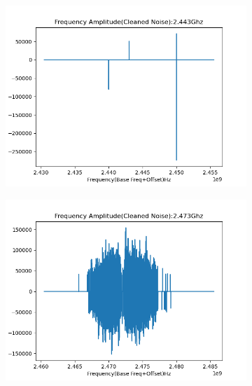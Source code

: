 \begin{itemize}
    \begin{figure}[H]
      \label{drone}
      \begin{subfigure}{0.5\textwidth}
        \includegraphics[width=0.9\linewidth ]{ images/nondrone_2.413Ghz-FA-5.00.png }
        \label{fig:subim1}
      \end{subfigure}
      \begin{subfigure}{0.5\textwidth}
        \includegraphics[width=0.9\linewidth]{ images/nondrone_2.413Ghz-FA-6.00.png }
        \label{fig:subim2}
      \end{subfigure}


\end{figure}
\end{itemize}
